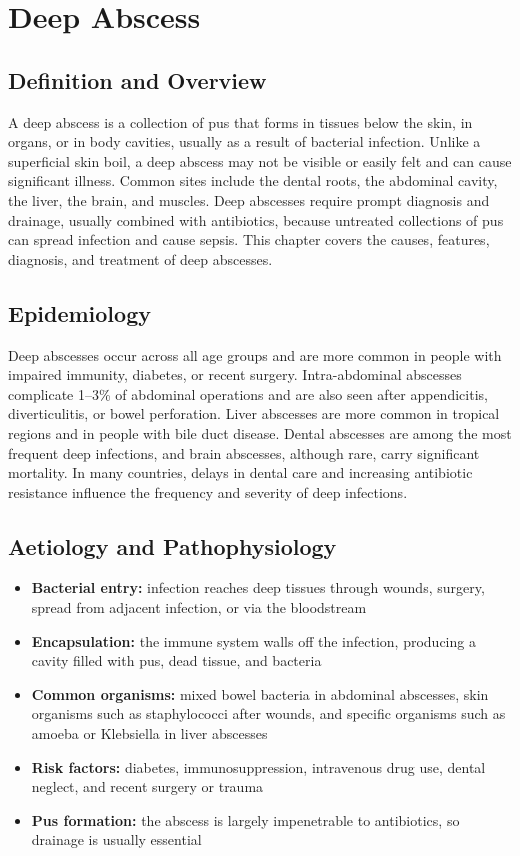 \chapter{Deep Abscess}

\section*{Definition and Overview}
A deep abscess is a collection of pus that forms in tissues below the skin, in organs, or in body cavities, usually as a result of bacterial infection. Unlike a superficial skin boil, a deep abscess may not be visible or easily felt and can cause significant illness. Common sites include the dental roots, the abdominal cavity, the liver, the brain, and muscles. Deep abscesses require prompt diagnosis and drainage, usually combined with antibiotics, because untreated collections of pus can spread infection and cause sepsis. This chapter covers the causes, features, diagnosis, and treatment of deep abscesses.

\section*{Epidemiology}
Deep abscesses occur across all age groups and are more common in people with impaired immunity, diabetes, or recent surgery. Intra-abdominal abscesses complicate 1--3\% of abdominal operations and are also seen after appendicitis, diverticulitis, or bowel perforation. Liver abscesses are more common in tropical regions and in people with bile duct disease. Dental abscesses are among the most frequent deep infections, and brain abscesses, although rare, carry significant mortality. In many countries, delays in dental care and increasing antibiotic resistance influence the frequency and severity of deep infections.

\section*{Aetiology and Pathophysiology}
\begin{itemize}
    \item \textbf{Bacterial entry:} infection reaches deep tissues through wounds, surgery, spread from adjacent infection, or via the bloodstream
    \item \textbf{Encapsulation:} the immune system walls off the infection, producing a cavity filled with pus, dead tissue, and bacteria
    \item \textbf{Common organisms:} mixed bowel bacteria in abdominal abscesses, skin organisms such as staphylococci after wounds, and specific organisms such as amoeba or Klebsiella in liver abscesses
    \item \textbf{Risk factors:} diabetes, immunosuppression, intravenous drug use, dental neglect, and recent surgery or trauma
    \item \textbf{Pus formation:} the abscess is largely impenetrable to antibiotics, so drainage is usually essential
\end{itemize}


